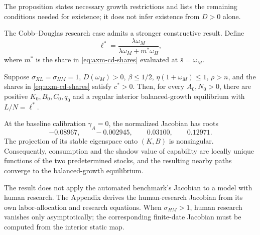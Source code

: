 The proposition states necessary growth restrictions and lists the remaining
conditions needed for existence; it does not infer existence from \(D>0\) alone.

The Cobb--Douglas research case admits a stronger constructive result. Define
\begin{equation}
 \ell^*=\frac{\lambda\omega_M}
 {\lambda\omega_M+m^*\omega_H},
 \label{eq:axm-cd-human-labor-share}
\end{equation}
where \(m^*\) is the share in \eqref{eq:axm-cd-shares} evaluated at
\(\bar s=\omega_M\).

\begin{proposition}
\label{prop:axm-cd-human-existence}
Suppose \(\sigma_{XL}=\sigma_{HM}=1\), \(D(\omega_M)>0\),
\(\beta\leq1/2\), \(\eta(1+\omega_M)\leq1\), \(\rho>n\), and the
shares in \eqref{eq:axm-cd-shares} satisfy \(c^*>0\). Then, for every
\(A_0,N_0>0\), there are positive \(K_0,B_0,C_0,q_0\) and a regular interior
balanced-growth equilibrium with \(L/N=\ell^*\).

At the baseline calibration \(\gamma_A=0\), the normalized Jacobian has roots
\begin{equation}
 -0.08967,\qquad -0.002945,\qquad 0.03100,\qquad 0.12971.
 \label{eq:axm-cd-human-jacobian-roots}
\end{equation}
The projection of its stable eigenspace onto \((K,B)\) is nonsingular.
Consequently, consumption and the shadow value of capability are locally unique
functions of the two predetermined stocks, and the resulting nearby paths
converge to the balanced-growth equilibrium.
\end{proposition}

The result does not apply the automated benchmark's Jacobian to a model with
human research. The Appendix derives the human-research Jacobian from its own
labor-allocation and research equations. When \(\sigma_{HM}>1\), human research
vanishes only asymptotically; the corresponding finite-date Jacobian must be
computed from the interior static map.

